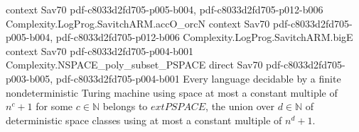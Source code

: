 \begin{theorem}
  {context}
  {Sav70}
  {pdf-c8033d2fd705-p005-b004,
    pdf-c8033d2fd705-p012-b006}
\proofstep
  {Complexity.LogProg.SavitchARM.accO_orcN}
  {context}
  {Sav70}
  {pdf-c8033d2fd705-p005-b004,
    pdf-c8033d2fd705-p012-b006}
\proofstep
  {Complexity.LogProg.SavitchARM.bigE}
  {context}
  {Sav70}
  {pdf-c8033d2fd705-p004-b001}
\proofstep
  {Complexity.NSPACE_poly_subset_PSPACE}
  {direct}
  {Sav70}
  {pdf-c8033d2fd705-p003-b005,
    pdf-c8033d2fd705-p004-b001}
Every language decidable by a finite nondeterministic Turing machine using space at most
a constant multiple of $n^c+1$ for some $c\in\mathbb{N}$ belongs to $	ext{PSPACE}$, the
union over $d\in\mathbb{N}$ of deterministic space classes using at most a constant
multiple of $n^d+1$.
\end{theorem}
